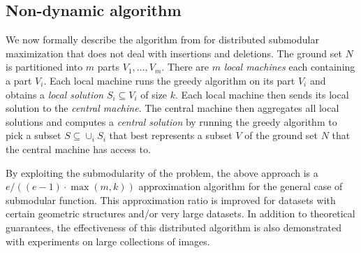 \subsection{Non-dynamic algorithm}

We now formally describe the algorithm from \citet{mirzasoleiman2013distributed} for distributed submodular maximization that does not deal with insertions and deletions. The ground set $N$ is partitioned into $m$ parts $V_1, \ldots, V_m$. There are $m$ \emph{local machines} each containing a part $V_i$. Each local machine runs the greedy algorithm on its part $V_i$ and obtains a \emph{local solution} $S_i \subseteq V_i$ of size $k$. Each local machine then sends its local solution to the \emph{central machine}. The central machine then aggregates all local solutions and computes a \emph{central solution} by running the greedy algorithm to pick a subset $S \subseteq \cup_i S_i$ that best represents a subset $V$ of the ground set $N$ that the central machine has access to.

By exploiting the submodularity of the problem, the above approach is a $e / ((e-1) \cdot \max(m,k))$ approximation algorithm for the general case of submodular function. This approximation ratio is improved for datasets with certain geometric structures and/or very large datasets. In addition to theoretical guarantees, the effectiveness of this distributed algorithm is also demonstrated with experiments on large collections of images.